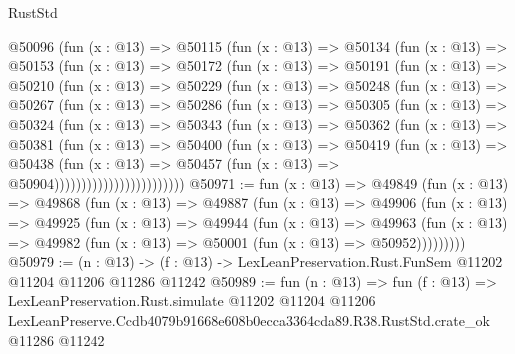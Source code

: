 \begin{lexlean}{RustStd}
\begin{coremodule}
          @50096
            (fun (x : @13) =>
            @50115
              (fun (x : @13) =>
              @50134
                (fun (x : @13) =>
                @50153
                  (fun (x : @13) =>
                  @50172
                    (fun (x : @13) =>
                    @50191
                      (fun (x : @13) =>
                      @50210
                        (fun (x : @13) =>
                        @50229
                          (fun (x : @13) =>
                          @50248
                            (fun (x : @13) =>
                            @50267
                              (fun (x : @13) =>
                              @50286
                                (fun (x : @13) =>
                                @50305
                                  (fun (x : @13) =>
                                  @50324
                                    (fun (x : @13) =>
                                    @50343
                                      (fun (x : @13) =>
                                      @50362
                                        (fun (x : @13) =>
                                        @50381
                                          (fun (x : @13) =>
                                          @50400
                                            (fun (x : @13) =>
                                            @50419
                                              (fun (x : @13) =>
                                              @50438
                                                (fun (x : @13) =>
                                                @50457
                                                  (fun (x : @13) => @50904))))))))))))))))))))))))
@50971 := fun (x : @13) =>
  @49849
    (fun (x : @13) =>
    @49868
      (fun (x : @13) =>
      @49887
        (fun (x : @13) =>
        @49906
          (fun (x : @13) =>
          @49925
            (fun (x : @13) =>
            @49944
              (fun (x : @13) =>
              @49963
                (fun (x : @13) => @49982 (fun (x : @13) => @50001 (fun (x : @13) => @50952)))))))))
@50979 := (n : @13) ->
  (f : @13) -> LexLeanPreservation.Rust.FunSem @11202 @11204 @11206 @11286 @11242
@50989 := fun (n : @13) =>
  fun (f : @13) =>
  LexLeanPreservation.Rust.simulate
    @11202
    @11204
    @11206
    LexLeanPreserve.Ccdb4079b91668e608b0ecca3364cda89.R38.RustStd.crate_ok
    @11286
    @11242
\end{coremodule}
\end{lexlean}

